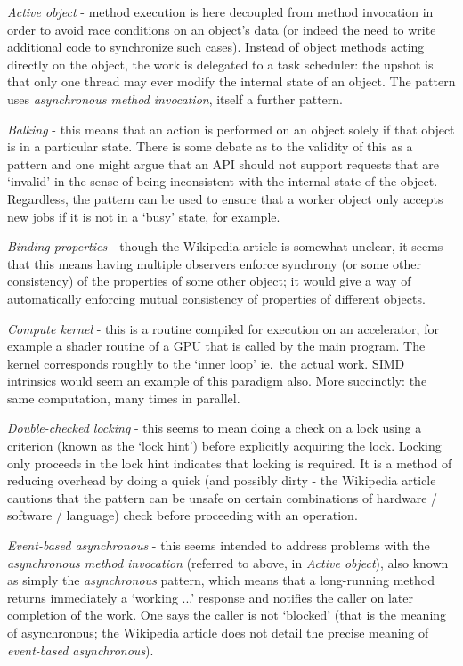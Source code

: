 {\it Active object} - method execution is here decoupled from method invocation in order to avoid race conditions on an object's data (or indeed the need	 to write additional code to synchronize such cases).  
Instead of object methods acting directly on the object, the work is delegated to a task scheduler: the upshot is that only one thread may ever modify the internal state of an object.  
The pattern uses {\it asynchronous method invocation}, itself a further pattern.

{\it Balking} - this means that an action is performed on an object solely if that object is in a particular state.  
There is some debate as to the validity of this as a pattern and one might argue that an API should not support requests that are `invalid' in the sense of being inconsistent with the internal state of the object.  
Regardless, the pattern can be used to ensure that a worker object only accepts new jobs if it is not in a `busy' state, for example.

{\it Binding properties} - though the Wikipedia article is somewhat unclear, it seems that this means having multiple observers enforce synchrony (or some other consistency) of the properties of some other object; it would give a way of automatically enforcing mutual consistency of properties of different objects.

{\it Compute kernel} - this is a routine compiled for execution on an accelerator, for example a shader routine of a GPU that is called by the main program.  
The kernel corresponds roughly to the `inner loop' ie.\ the actual work.  
SIMD intrinsics would seem an example of this paradigm also.  
More succinctly: the same computation, many times in parallel.

{\it Double-checked locking} - this seems to mean doing a check on a lock using a criterion (known as the `lock hint') before explicitly acquiring the lock.  
Locking only proceeds in the lock hint indicates that locking is required.  
It is a method of reducing overhead by doing a quick (and possibly dirty - the Wikipedia article cautions that the pattern can be unsafe on certain combinations of hardware / software / language) check before proceeding with an operation.

{\it Event-based asynchronous} - this seems intended to address problems with the {\it asynchronous method invocation} (referred to above, in {\it Active object}), also known as simply the {\it asynchronous} pattern, which means that a long-running method returns immediately a `working ...' response and notifies the caller on later completion of the work.  
One says the caller is not `blocked' (that is the meaning of asynchronous; the Wikipedia article \cite{softwarepatternwiki} does not detail the precise meaning of {\it event-based asynchronous}).

